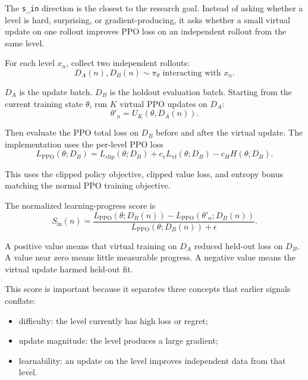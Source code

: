 \documentclass[11pt]{article}
\begin{document}
The \texttt{s\_in} direction is the closest to the research goal. Instead of asking
whether a level is hard, surprising, or gradient-producing, it asks whether a
small virtual update on one rollout improves PPO loss on an independent rollout
from the same level.

For each level $x_n$, collect two independent rollouts:
\begin{equation}
  D_A(n), D_B(n) \sim \pi_\theta \text{ interacting with } x_n.
\end{equation}

$D_A$ is the update batch. $D_B$ is the holdout evaluation batch. Starting from
the current training state $\theta$, run $K$ virtual PPO updates on $D_A$:
\begin{equation}
  \theta'_n = U_K(\theta, D_A(n)).
\end{equation}

Then evaluate the PPO total loss on $D_B$ before and after the virtual update.
The implementation uses the per-level PPO loss
\begin{equation}
  L_{\mathrm{PPO}}(\theta; D_B)
    = L_{\mathrm{clip}}(\theta; D_B)
      + c_v L_{\mathrm{vf}}(\theta; D_B)
      - c_H H(\theta; D_B).
\end{equation}

This uses the clipped policy objective, clipped value loss, and entropy bonus
matching the normal PPO training objective.

The normalized learning-progress score is
\begin{equation}
  S_{\mathrm{in}}(n)
    = \frac{
      L_{\mathrm{PPO}}(\theta; D_B(n))
      -
      L_{\mathrm{PPO}}(\theta'_n; D_B(n))
    }{
      L_{\mathrm{PPO}}(\theta; D_B(n)) + \epsilon
    }.
\end{equation}

A positive value means that virtual training on $D_A$ reduced held-out loss on
$D_B$. A value near zero means little measurable progress. A negative value
means the virtual update harmed held-out fit.

This score is important because it separates three concepts that earlier
signals conflate:
\begin{itemize}[leftmargin=*]
  \item difficulty: the level currently has high loss or regret;
  \item update magnitude: the level produces a large gradient;
  \item learnability: an update on the level improves independent data from that level.
\end{itemize}
\end{document}
